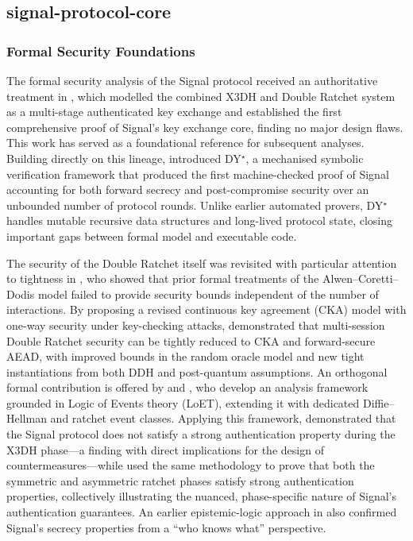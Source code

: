\subsection{signal-protocol-core}

\subsubsection{Formal Security Foundations}

The formal security analysis of the Signal protocol received an authoritative treatment in \textcite{cohn-gordon2020}, which modelled the combined X3DH and Double Ratchet system as a multi-stage authenticated key exchange and established the first comprehensive proof of Signal's key exchange core, finding no major design flaws. This work has served as a foundational reference for subsequent analyses. Building directly on this lineage, \textcite{bhargavan2021} introduced DY$^\star$, a mechanised symbolic verification framework that produced the first machine-checked proof of Signal accounting for both forward secrecy and post-compromise security over an unbounded number of protocol rounds. Unlike earlier automated provers, DY$^\star$ handles mutable recursive data structures and long-lived protocol state, closing important gaps between formal model and executable code.

The security of the Double Ratchet itself was revisited with particular attention to tightness in \textcite{collins2024}, who showed that prior formal treatments of the Alwen--Coretti--Dodis model failed to provide security bounds independent of the number of interactions. By proposing a revised continuous key agreement (CKA) model with one-way security under key-checking attacks, \textcite{collins2024} demonstrated that multi-session Double Ratchet security can be tightly reduced to CKA and forward-secure AEAD, with improved bounds in the random oracle model and new tight instantiations from both DDH and post-quantum assumptions. An orthogonal formal contribution is offered by \textcite{li2024} and \textcite{xiao2025}, who develop an analysis framework grounded in Logic of Events theory (LoET), extending it with dedicated Diffie--Hellman and ratchet event classes. Applying this framework, \textcite{li2024} demonstrated that the Signal protocol does not satisfy a strong authentication property during the X3DH phase—a finding with direct implications for the design of countermeasures—while \textcite{xiao2025} used the same methodology to prove that both the symmetric and asymmetric ratchet phases satisfy strong authentication properties, collectively illustrating the nuanced, phase-specific nature of Signal's authentication guarantees. An earlier epistemic-logic approach in \textcite{kamkuemah2021} also confirmed Signal's secrecy properties from a ``who knows what'' perspective.

